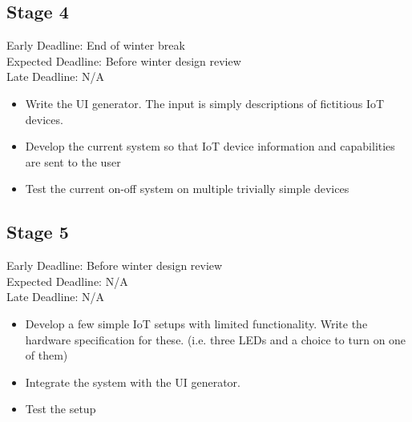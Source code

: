 \documentclass{article}
\begin{document}
\subsection{Stage 4}
Early Deadline: End of winter break \\
Expected Deadline: Before winter design review \\
Late Deadline: N/A \\
\begin{itemize}
\item Write the UI generator. The input is simply descriptions of fictitious IoT devices.
\item Develop the current system so that IoT device information and capabilities are sent to the user
\item Test the current on-off system on multiple trivially simple devices
\end{itemize}

\subsection{Stage 5}
Early Deadline: Before winter design review \\
Expected Deadline: N/A \\
Late Deadline: N/A \\
\begin{itemize}
\item Develop a few simple IoT setups with limited functionality. Write the hardware specification for these. (i.e. three LEDs and a choice to turn on one of them)
\item Integrate the system with the UI generator.
\item Test the setup
\end{itemize}
\end{document}
